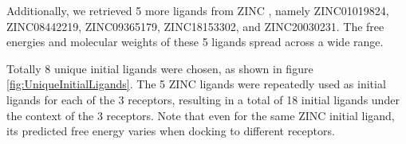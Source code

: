 \documentclass[10pt,conference,letterpaper]{IEEEtran}
\begin{document}
Additionally, we retrieved 5 more ligands from ZINC \cite{55}, namely ZINC01019824, ZINC08442219, ZINC09365179, ZINC18153302, and ZINC20030231.
The free energies and molecular weights of these 5 ligands spread across a wide range.

Totally 8 unique initial ligands were chosen, as shown in figure \ref{fig:UniqueInitialLigands}.
The 5 ZINC ligands were repeatedly used as initial ligands for each of the 3 receptors, resulting in a total of 18 initial ligands under the context of the 3 receptors.
Note that even for the same ZINC initial ligand, its predicted free energy varies when docking to different receptors.

\begin{figure}
  \centering
\end{figure}
\end{document}
